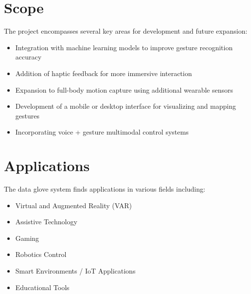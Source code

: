\vspace{1.5\baselineskip} 

\section{Scope}
The project encompasses several key areas for development and future expansion:
\begin{itemize}
    \item Integration with machine learning models to improve gesture recognition accuracy
    \item Addition of haptic feedback for more immersive interaction
    \item Expansion to full-body motion capture using additional wearable sensors
    \item Development of a mobile or desktop interface for visualizing and mapping gestures
    \item Incorporating voice + gesture multimodal control systems
\end{itemize}
\vspace{1.5\baselineskip}
\section{Applications}
The data glove system finds applications in various fields including:
\begin{itemize}
    \item Virtual and Augmented Reality (VAR)
    \item Assistive Technology
    \item Gaming
    \item Robotics Control
    \item Smart Environments / IoT Applications
    \item Educational Tools
\end{itemize}


